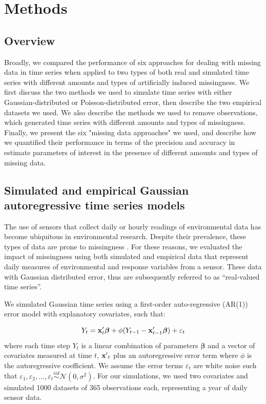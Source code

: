\documentclass{article}
\begin{document}
\section*{Methods} 

\subsection*{Overview}


Broadly, we compared the performance of six approaches for dealing with missing data in time series when applied to two types of both real and simulated time series with different amounts and types of artificially induced missingness. We first discuss the two methods we used to simulate time series with either Gaussian-distributed or Poisson-distributed error, then describe the two empirical datasets we used. %
We also describe the methods we used to remove observations, which generated time series with different amounts and types of missingness. Finally, we present the six  "missing data approaches" we used, and describe how we quantified their performance in terms of the precision and accuracy in estimate parameters of interest in the presence of different amounts and types of missing data.   

\subsection*{Simulated and empirical Gaussian autoregressive time series models}

The use of sensors that collect daily or hourly readings of environmental data has become ubiquitous in environmental research. Despite their prevalence, these types of data are prone to missingness \citep{chen2013ecological}. For these reasons, we evaluated the impact of missingness using both simulated and empirical data that represent daily measures of environmental and response variables from a sensor. These data with Gaussian distributed error, thus are subsequently referred to as “real-valued time series”.  

We simulated Gaussian time series using a first-order auto-regressive (AR(1)) error model with explanatory covariates, such that:

\begin{equation}
    Y_t = {\bf x}_t'{\bm \beta} + \phi (Y_{t-1} - {\bf x}_{t-1}'{\bm \beta}) + \varepsilon_t
\label{eq:ar1}
\end{equation}
where each time step \(Y_t\) is a linear combination of parameters \(\bm \beta\) and a vector of covariates measured at time $t$, \({\bf x'}_t\) plus an autoregressive error term where \(\phi\) is the autoregressive coefficient. We assume the error terms \(\varepsilon_t\) are white noise such that $\varepsilon_1, \varepsilon_2,..., \varepsilon_t \overset{iid}{\sim} \mathcal{N}(0, \sigma^2)$. For our simulations, we used two covariates and simulated 1000 datasets of 365 observations each, representing a year of daily sensor data. 
\end{document}
